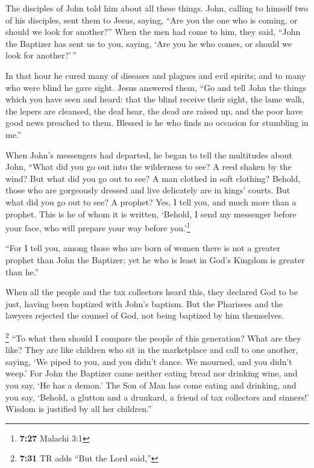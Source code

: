  The disciples of John told him about all these things.
 John, calling to himself two of his disciples, sent them
to Jesus, saying, ``Are you the one who is coming, or should we look for
another?''  When the men had come to him, they said,
``John the Baptizer has sent us to you, saying, `Are you he who comes,
or should we look for another?'\,''

 In that hour he cured many of diseases and plagues and
evil spirits; and to many who were blind he gave sight. 
Jesus answered them, ``Go and tell John the things which you have seen
and heard: that the blind receive their sight, the lame walk, the lepers
are cleansed, the deaf hear, the dead are raised up, and the poor have
good news preached to them.  Blessed is he who finds no
occasion for stumbling in me.''

 When John's messengers had departed, he began to tell
the multitudes about John, ``What did you go out into the wilderness to
see? A reed shaken by the wind?  But what did you go out
to see? A man clothed in soft clothing? Behold, those who are gorgeously
dressed and live delicately are in kings' courts.  But
what did you go out to see? A prophet? Yes, I tell you, and much more
than a prophet.  This is he of whom it is written,
`Behold, I send my messenger before your face, who will prepare your way
before you.'\footnote{\textbf{7:27} Malachi 3:1}

 ``For I tell you, among those who are born of women
there is not a greater prophet than John the Baptizer; yet he who is
least in God's Kingdom is greater than he.''

 When all the people and the tax collectors heard this,
they declared God to be just, having been baptized with John's baptism.
 But the Pharisees and the lawyers rejected the counsel
of God, not being baptized by him themselves.

 \footnote{\textbf{7:31} TR adds ``But the Lord said,''}
``To what then should I compare the people of this generation? What are
they like?  They are like children who sit in the
marketplace and call to one another, saying, `We piped to you, and you
didn't dance. We mourned, and you didn't weep.'  For John
the Baptizer came neither eating bread nor drinking wine, and you say,
`He has a demon.'  The Son of Man has come eating and
drinking, and you say, `Behold, a glutton and a drunkard, a friend of
tax collectors and sinners!'  Wisdom is justified by all
her children.''

